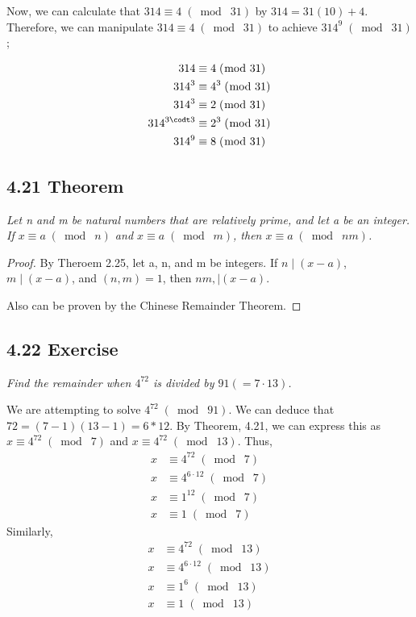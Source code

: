 \documentclass{article}
\begin{document}
Now, we can calculate that $314 \equiv 4 \;(\bmod\; 31)$ by $314 = 31(10) + 4$. Therefore, we can manipulate $314 \equiv 4 \;(\bmod\; 31)$ to achieve $314^9 \;(\bmod\; 31)$;

\begin{align*}
    &&314 & \equiv 4 \;(\bmod\; 31)&&\\
    &&314^3 & \equiv 4^3 \;(\bmod\; 31)&&\\
    &&314^3 & \equiv 2 \;(\bmod\; 31)&&\\
    &&314^{3\codt3} & \equiv 2^3 \;(\bmod\; 31)&&\\
    &&314^9 & \equiv 8 \;(\bmod\; 31)&&
\end{align*}

\subsection*{4.21 Theorem} 
\quad \textit{Let n and m be natural numbers that are relatively prime, and let a be an integer. If $x \equiv a \;(\bmod\; n)$ and $x \equiv a \;(\bmod\; m)$, then $x \equiv a \;(\bmod\; nm)$.}

\begin{proof}
By Theroem 2.25, let a, n, and m be integers. If $n \mid (x-a)$, $m \mid (x-a)$, and $(n,m) = 1$, then $nm, \mid (x-a)$.

Also can be proven by the Chinese Remainder Theorem.
\end{proof}

\subsection*{4.22 Exercise} 
\quad \textit{Find the remainder when $4^{72}$ is divided by $91 (= 7 \cdot 13)$.}

We are attempting to solve $4^{72} \;(\bmod\; 91)$. We can deduce that $72 = (7-1)(13-1) = 6 * 12$. By Theorem, 4.21, we can express this as $x \equiv 4^{72} \;(\bmod\; 7)$ and $x \equiv 4^{72} \;(\bmod\; 13)$. Thus,
\begin{align*}
    && x &\equiv 4^{72} \;(\bmod\; 7)&&\\
    && x &\equiv 4^{6\cdot 12} \;(\bmod\; 7)&&\\
    && x &\equiv 1^12 \;(\bmod\; 7)&&\\
    && x &\equiv 1 \;(\bmod\; 7)&&
\end{align*}
Similarly,
\begin{align*}
    && x &\equiv 4^{72} \;(\bmod\; 13)&&\\
    && x &\equiv 4^{6\cdot 12} \;(\bmod\; 13)&&\\
    && x &\equiv 1^6 \;(\bmod\; 13)&&\\
    && x &\equiv 1 \;(\bmod\; 13)&&
\end{align*}
\end{document}
